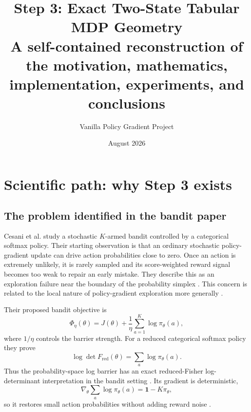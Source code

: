 \documentclass[10pt,a4paper]{article}
\title{Step 3: Exact Two-State Tabular MDP Geometry\\
\large A self-contained reconstruction of the motivation, mathematics,
implementation, experiments, and conclusions}
\author{Vanilla Policy Gradient Project}
\date{August 2026}
\begin{document}
\maketitle

\begin{center}
\end{center}

\tableofcontents

\section{Scientific path: why Step 3 exists}

\subsection{The problem identified in the bandit paper}

Cesani et al. study a stochastic $K$-armed bandit controlled by a categorical
softmax policy.  Their starting observation is that an ordinary stochastic
policy-gradient update can drive action probabilities close to zero.  Once an
action is extremely unlikely, it is rarely sampled and its score-weighted
reward signal becomes too weak to repair an early mistake.  They describe this
as an exploration failure near the boundary of the probability simplex
\cite[Secs.~1--3]{cesani2026}.  This concern is related to the local nature of
policy-gradient exploration more generally \cite{agarwal2020}.

Their proposed bandit objective is
\begin{equation}
\Phi_\eta(\theta)
=J(\theta)+\frac1\eta\sum_{a=1}^{K}\log\pi_\theta(a),
\label{eq:cesani-objective}
\end{equation}
where $1/\eta$ controls the barrier strength.  For a reduced categorical
softmax policy they prove
\begin{equation}
\log\det F_{\mathrm{red}}(\theta)
=\sum_a\log\pi_\theta(a).
\label{eq:cesani-identity}
\end{equation}
Thus the probability-space log barrier has an exact reduced-Fisher
log-determinant interpretation in the bandit setting
\cite[Sec.~4 and App.~B.3.2]{cesani2026}.  Its gradient is deterministic,
\begin{equation}
\nabla_\theta\sum_a\log\pi_\theta(a)=\mathbf 1-K\pi_\theta,
\label{eq:cesani-gradient}
\end{equation}
so it restores small action probabilities without adding reward noise
\cite[Sec.~5 and App.~B.4]{cesani2026}.
\end{document}
